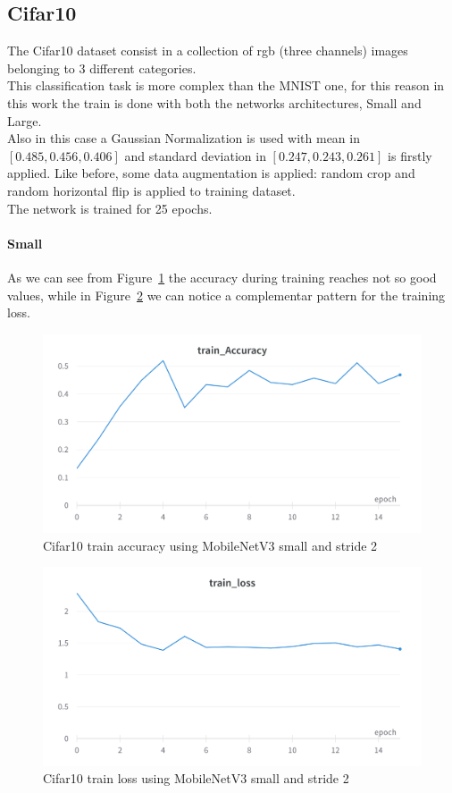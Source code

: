 \documentclass[12pt, letterpaper, twoside]{article}
\begin{document}
\subsection{Cifar10}
The Cifar10 dataset consist in a collection of rgb (three channels) images belonging to 3 different categories.\\
This classification task is more complex than the MNIST one, for this reason in this work the train is done with both the networks architectures, Small and Large.\\
Also in this case a Gaussian Normalization is used with mean in $[0.485, 0.456, 0.406]$ and standard deviation in $[0.247, 0.243, 0.261]$ is firstly applied. Like before, some data augmentation is applied: random crop and random horizontal flip is applied to training dataset.\\
The network is trained for 25 epochs.\\
\paragraph{Small} 
As we can see from Figure~\ref{fig:cifar10_small_stride2_acc} the accuracy during training reaches not so good values, while in Figure~\ref{fig:cifar10_small_stride2_loss} we can notice a complementar pattern for the training loss.\\

\begin{figure}[H]
	\centering
	\includegraphics[width=.8\textwidth]{mnet_small_cifar10_accuracy_stride2.png}
	\caption{Cifar10 train accuracy using MobileNetV3 small and stride 2}
	\label{fig:cifar10_small_stride2_acc}
\end{figure}

\begin{figure}[H]
	\centering
	\includegraphics[width=.8\textwidth]{mnet_small_cifar10_loss_stride2.png}
	\caption{Cifar10 train loss using MobileNetV3 small and stride 2}
	\label{fig:cifar10_small_stride2_loss}
\end{figure}
\end{document}
